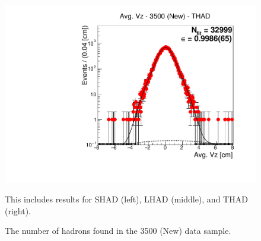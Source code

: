 \begin{figure}[H]
\hspace{-0.5cm}
\includegraphics[scale=0.25]{figures/plots/nonDDbar_fit_results/3650_new/fit_new_3500_data_THAD.pdf}
\caption{The number of hadrons found in the 3500 (New) data sample.}
{This includes results for SHAD (left), LHAD (middle), and THAD (right).}
\label{fig:hadron_fits_3500_new}
\end{figure}

